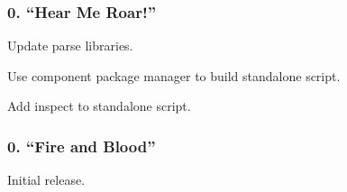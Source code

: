 \subsubsection*{0. “\+Hear Me Roar!”}


\begin{DoxyItemize}
\item Update parse libraries.
\item Use component package manager to build standalone script.
\item Add inspect to standalone script.
\end{DoxyItemize}

\subsubsection*{0. “\+Fire and Blood”}


\begin{DoxyItemize}
\item Initial release. 
\end{DoxyItemize}